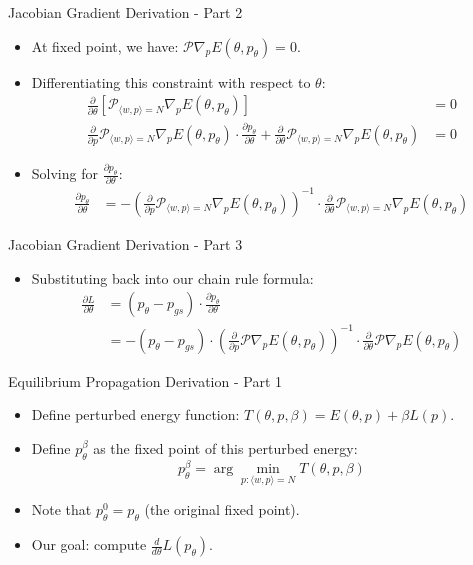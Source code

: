\documentclass{beamer}
\begin{document}
\begin{frame}{Jacobian Gradient Derivation - Part 2}
  \begin{itemize}
    \item At fixed point, we have: $\mathcal{P}\nabla_p E(\theta, p_{\theta}) = 0$.
    \item Differentiating this constraint with respect to $\theta$:
    \begin{align}
      \frac{\partial}{\partial \theta}\left[\mathcal{P}_{\langle w,p \rangle = N}\nabla_p E(\theta, p_{\theta})\right] &= 0 \\
      \frac{\partial}{\partial p}\mathcal{P}_{\langle w,p \rangle = N}\nabla_p E(\theta, p_{\theta}) \cdot \frac{\partial p_{\theta}}{\partial \theta} + \frac{\partial}{\partial \theta}\mathcal{P}_{\langle w,p \rangle = N}\nabla_p E(\theta, p_{\theta}) &= 0
    \end{align}
    \item Solving for $\frac{\partial p_{\theta}}{\partial \theta}$:
    \begin{align}
      \frac{\partial p_{\theta}}{\partial \theta} &= -\left(\frac{\partial}{\partial p}\mathcal{P}_{\langle w,p \rangle = N}\nabla_p E(\theta, p_{\theta})\right)^{-1} \cdot \frac{\partial}{\partial \theta}\mathcal{P}_{\langle w,p \rangle = N}\nabla_p E(\theta, p_{\theta})
    \end{align}
  \end{itemize}
\end{frame}

\begin{frame}{Jacobian Gradient Derivation - Part 3}
  \begin{itemize}
    \item Substituting back into our chain rule formula:
    \begin{align}
      \frac{\partial L}{\partial \theta} &= (p_{\theta} - p_{gs}) \cdot \frac{\partial p_{\theta}}{\partial \theta} \\
      &= -(p_{\theta} - p_{gs}) \cdot \left(\frac{\partial}{\partial p}\mathcal{P}\nabla_p E(\theta, p_{\theta})\right)^{-1} \cdot \frac{\partial}{\partial \theta}\mathcal{P}\nabla_p E(\theta, p_{\theta})
    \end{align}

  \end{itemize}
\end{frame}

\begin{frame}{Equilibrium Propagation Derivation - Part 1}
  \begin{itemize}
    \item Define perturbed energy function: $T(\theta,p,\beta)=E(\theta,p)+\beta L(p)$.
    \item Define $p_{\theta}^{\beta}$ as the fixed point of this perturbed energy:
    \[
      p_{\theta}^{\beta} = \arg\min_{p:\langle w,p \rangle = N} T(\theta, p, \beta)
    \]
    \item Note that $p_{\theta}^{0} = p_{\theta}$ (the original fixed point).
    \item Our goal: compute $\frac{d}{d\theta}L(p_{\theta})$.
  \end{itemize}
\end{frame}
\end{document}
